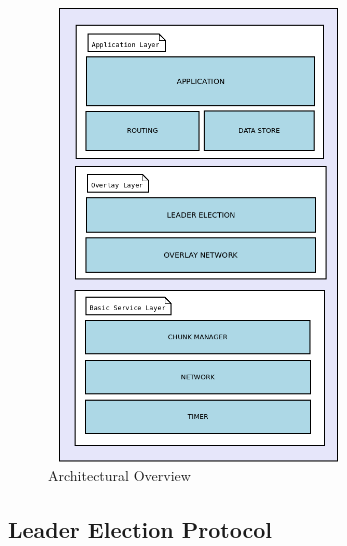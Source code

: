 \documentclass[12pt,a4paper,twoside,openright]{book}
\begin{document}
\begin{figure}[h]
	\includegraphics[width=8cm, height=12cm]{architecture_new}
	\centering
	\caption{Architectural Overview}
	\label{fig:architecture}
\end{figure}



\subsection{Leader Election Protocol}
\label{ssec:leaderElection}
\end{document}
